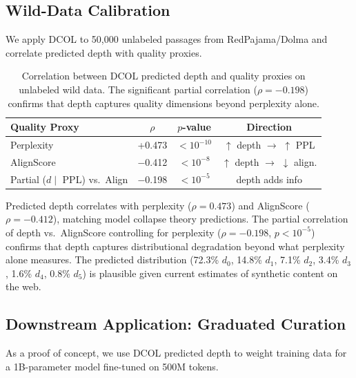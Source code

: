 \documentclass[11pt,a4paper]{article}
\newcommand{\ours}{DCOL}
\begin{document}
\subsection{Wild-Data Calibration}
\label{sec:wild}

We apply \ours{} to 50{,}000 unlabeled passages from RedPajama/Dolma and correlate predicted depth with quality proxies.

\begin{table}[t]
\centering
\small
\begin{tabular}{lccc}
\toprule
\textbf{Quality Proxy} & \textbf{$\rho$} & \textbf{$p$-value} & \textbf{Direction} \\
\midrule
Perplexity & +0.473 & $<10^{-10}$ & $\uparrow$ depth $\to$ $\uparrow$ PPL \\
AlignScore & $-$0.412 & $<10^{-8}$ & $\uparrow$ depth $\to$ $\downarrow$ align. \\
Partial ($d \mid$ PPL) vs.\ Align & $-$0.198 & $<10^{-5}$ & depth adds info \\
\bottomrule
\end{tabular}
\caption{Correlation between \ours{} predicted depth and quality proxies on unlabeled wild data. The significant partial correlation ($\rho = -0.198$) confirms that depth captures quality dimensions beyond perplexity alone.}
\label{tab:wild}
\end{table}

Predicted depth correlates with perplexity ($\rho = 0.473$) and AlignScore ($\rho = -0.412$), matching model collapse theory predictions. The partial correlation of depth vs.\ AlignScore controlling for perplexity ($\rho = -0.198$, $p < 10^{-5}$) confirms that depth captures distributional degradation beyond what perplexity alone measures. The predicted distribution (72.3\% $d_0$, 14.8\% $d_1$, 7.1\% $d_2$, 3.4\% $d_3$, 1.6\% $d_4$, 0.8\% $d_5$) is plausible given current estimates of synthetic content on the web.

\subsection{Downstream Application: Graduated Curation}
\label{sec:curation}

As a proof of concept, we use \ours{} predicted depth to weight training data for a 1B-parameter model fine-tuned on 500M tokens.
\end{document}
